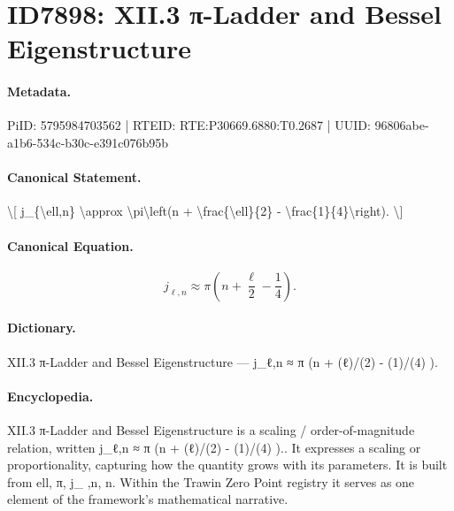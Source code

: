 \section*{ID7898: XII.3 π-Ladder and Bessel Eigenstructure}
\paragraph{Metadata.}
PiID: 5795984703562 | RTEID: RTE:P30669.6880:T0.2687 | UUID: 96806abe-a1b6-534c-b30c-e391c076b95b

\paragraph{Canonical Statement.}
\textbackslash{}[ j\_\{\textbackslash{}ell,n\} \textbackslash{}approx \textbackslash{}pi\textbackslash{}left(n + \textbackslash{}frac\{\textbackslash{}ell\}\{2\} - \textbackslash{}frac\{1\}\{4\}\textbackslash{}right). \textbackslash{}]

\paragraph{Canonical Equation.}
\[
j_{\ell,n} \approx \pi\left(n + \frac{\ell}{2} - \frac{1}{4}\right).
\]

\paragraph{Dictionary.}
XII.3 π-Ladder and Bessel Eigenstructure — j\_ℓ,n ≈ π (n + (ℓ)/(2) - (1)/(4) ).

\paragraph{Encyclopedia.}
XII.3 π-Ladder and Bessel Eigenstructure is a scaling / order-of-magnitude relation, written j\_ℓ,n ≈ π (n + (ℓ)/(2) - (1)/(4) ).. It expresses a scaling or proportionality, capturing how the quantity grows with its parameters. It is built from ell, π, j\_ ,n, n. Within the Trawin Zero Point registry it serves as one element of the framework's mathematical narrative.
